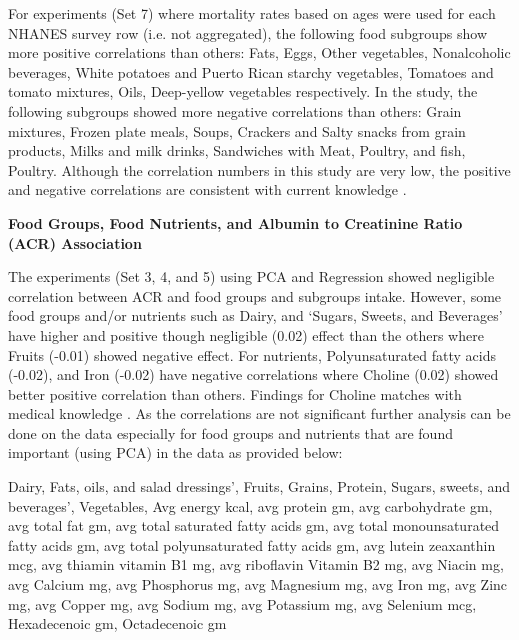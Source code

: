 \noindent For experiments (Set 7) where mortality rates based on ages were used for each NHANES survey row (i.e. not aggregated), the following food subgroups show more positive correlations than others: Fats, Eggs, Other vegetables, Nonalcoholic beverages, White potatoes and Puerto Rican starchy vegetables, Tomatoes and tomato mixtures, Oils, Deep-yellow vegetables respectively. In the study, the following subgroups showed more negative correlations than others: Grain mixtures, Frozen plate meals, Soups, Crackers and Salty snacks from grain products, Milks and milk drinks, Sandwiches with Meat, Poultry, and fish, Poultry. Although the correlation numbers in this study are very low, the positive and negative correlations are consistent with current knowledge \cite{Hsuetal2013} \cite{Fernandez-Pradoetal2017} \cite{RippeAngelopoulos2016} \cite{KaraliusShoham2013} \cite{Jaimonetal2017} \cite{Jilian2018} \cite{NKF2019} \cite{Ueharaetal2016} \cite{Nettletonetal2008} \cite{Jacobsetal2009}.


\noindent \textbf{Food Groups, Food Nutrients, and Albumin to Creatinine Ratio (ACR) Association}

\noindent The experiments (Set 3, 4, and 5) using PCA and Regression showed negligible correlation between ACR and food groups and subgroups intake. However, some food groups and/or nutrients such as Dairy, and  `Sugars, Sweets, and Beverages'  have higher and positive though negligible (0.02) effect than the others where Fruits (-0.01) showed negative effect.  For nutrients, Polyunsaturated fatty acids (-0.02), and Iron (-0.02) have negative correlations where Choline (0.02) showed better positive correlation than others. Findings for Choline matches with medical knowledge      \cite{Fernandez-Pradoetal2017} . As the correlations are not significant further analysis can be done on the data especially for food groups and nutrients that are found important (using PCA) in the data as provided below:

\noindent Dairy,  Fats, oils, and salad dressings’,  Fruits,  Grains,  Protein,   Sugars, sweets, and beverages’, Vegetables, Avg energy kcal,  avg protein gm,  avg carbohydrate gm,  avg total fat gm,  avg total saturated fatty acids gm, avg total monounsaturated fatty acids gm,  avg total polyunsaturated fatty acids gm, avg lutein zeaxanthin mcg,  avg thiamin vitamin B1 mg,  avg riboflavin Vitamin B2 mg,  avg Niacin mg, avg Calcium mg,  avg Phosphorus mg,  avg Magnesium mg,  avg Iron mg, avg Zinc mg,  avg Copper mg,  avg Sodium mg,  avg Potassium mg,  avg Selenium mcg,  Hexadecenoic gm,  Octadecenoic gm

